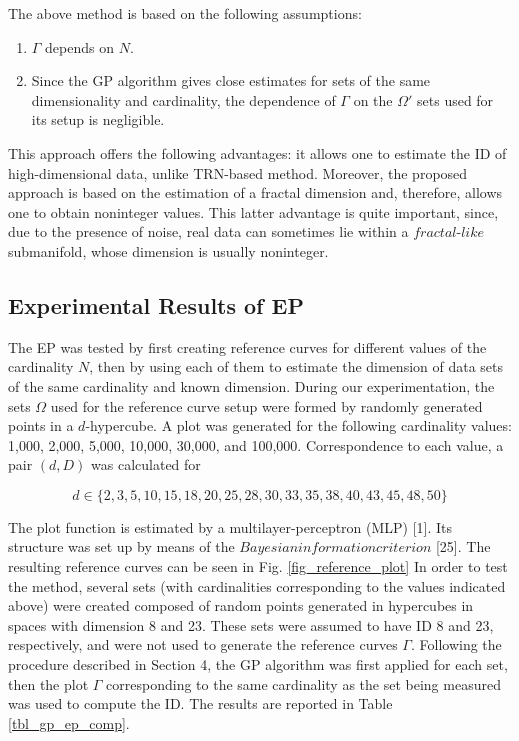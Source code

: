 \documentclass[journal]{IEEEtran}
\begin{document}
The above method is based on the following assumptions:
\begin{enumerate}[\IEEEsetlabelwidth{12)}]
  \item \(\Gamma\) depends on \(N\).
  \item Since the GP algorithm gives close estimates for sets of the 
  same dimensionality and cardinality, the dependence of \(\Gamma\) on the \(\Omega'\) sets used for its setup is negligible.
\end{enumerate}

This approach offers the following advantages: it allows one to estimate the ID of high-dimensional data, 
unlike TRN-based method. Moreover, the proposed approach is based on the estimation of a fractal dimension 
and, therefore, allows one to obtain noninteger values. This latter advantage is quite important, 
since, due to the presence of noise, real data can sometimes lie within a \(fractal\)-\(like\) submanifold, whose dimension is usually noninteger.

\subsection{Experimental Results of EP}
The EP was tested by first creating reference curves for different values of the cardinality \(N\), 
then by using each of them to estimate the dimension of data sets of the same cardinality and known dimension.
During our experimentation, the sets \(\Omega\) used for the reference curve setup were formed by randomly generated points in a \(d\)-hypercube. 
A plot was generated for the following cardinality values: 1,000, 2,000, 5,000, 10,000, 30,000, and 100,000. 
Correspondence to each value, a pair \((d, D)\) was calculated for

\begin{equation}
  \label{eq-ep-1}
  d \in \{2, 3, 5, 10, 15, 18, 20, 25, 28, 30, 33, 35, 38, 40, 43, 45, 48, 50\}
\end{equation}

The plot function is estimated by a multilayer-perceptron (MLP) [1]. 
Its structure was set up by means of the \(Bayesian information criterion\) [25].
The resulting reference curves can be seen in Fig. \ref{fig_reference_plot}
In order to test the method, several sets (with cardinalities corresponding to the values indicated above) were created 
composed of random points generated in hypercubes in spaces with dimension 8 and 23. These sets were assumed to have ID 8 and 23, 
respectively, and were not used to generate the reference curves \(\Gamma\).
Following the procedure described in Section 4, the GP algorithm was first applied for each set, then the plot  \(\Gamma\) 
corresponding to the same cardinality as the set being measured was used to compute the ID. The results are reported in Table \ref{tbl_gp_ep_comp}.
\end{document}
